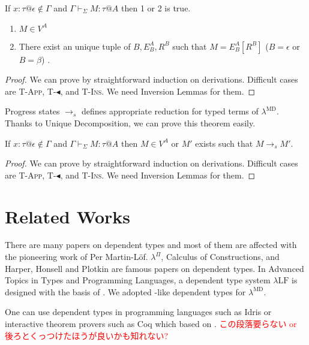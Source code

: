 \documentclass[runningheads]{llncs}
\newcommand{\red}[1]{\textcolor{red}{#1 }}
\newcommand{\LMD}{$\lambda^{\textrm{MD}}$\xspace}
\newcommand{\LLF}{$\lambda\textrm{LF}$\xspace}
\newcommand{\G}{\Gamma}
\newcommand{\V}{\vdash_\Sigma}
\newcommand{\TBL}{\blacktriangleleft}
\newcommand{\TApp}{\textsc{T-App}}
\newcommand{\TTBL}{\textsc{T-$\TBL$}}
\newcommand{\TIns}{\textsc{T-Ins}}
\begin{document}
  \begin{theorem}
      If $x:\tau @\epsilon \notin \G$ and $\G \V M : \tau @ A$ then 1 or 2 is true.
      \begin{enumerate}
          \item $ M \in V^A$
          \item There exist an unique tuple of $B, E^A_B, R^B$ such that $M = E^A_B[R^B]$ ($B = \epsilon$ or $B = \beta$) .
      \end{enumerate}
  \end{theorem}

  \begin{proof}
      We can prove by straightforward induction on derivations.
      Difficult cases are \TApp, \TTBL, and \TIns.
      We need Inversion Lemmas for them.
  \end{proof}

  Progress states $\longrightarrow_s$ defines appropriate reduction for typed terms of \LMD.
  Thanks to Unique Decomposition, we can prove this theorem easily.

  \begin{theorem}[Progress]
      If $x:\tau @\epsilon \notin \G$ and $\G \V M : \tau  @ A$ then
      $ M \in V^A $ or $M'$ exists such that $M \longrightarrow_s M'$.
  \end{theorem}

  \begin{proof}
      We can prove by straightforward induction on derivations.
      Difficult cases are \TApp, \TTBL, and \TIns.
      We need Inversion Lemmas for them.
  \end{proof}

  \section{Related Works}


  There are many papers on dependent types and most of them are affected with the pioneering work of Per Martin-L\"{o}f.
  $\lambda^\Pi$\cite{Meyer1986}, Calculus of Constructions\cite{coquand:inria-00076024}, 
  and Harper, Honsell and Plotkin\cite{harper1993framework} are famous papers on dependent types.
  In Advanced Topics in Types and Programming Languages\cite{attapl},
  a dependent type system \LLF is designed with the basis of \cite{harper1993framework}.
  We adopted \cite{attapl}-like dependent types for \LMD.

  One can use dependent types in programming languages such as Idris\cite{brady2013idris} or
  interactive theorem provers such as Coq\cite{09thecoq} which based on \cite{coquand:inria-00076024}.
  \red{この段落要らない or 後ろとくっつけたほうが良いかも知れない?}
\end{document}
